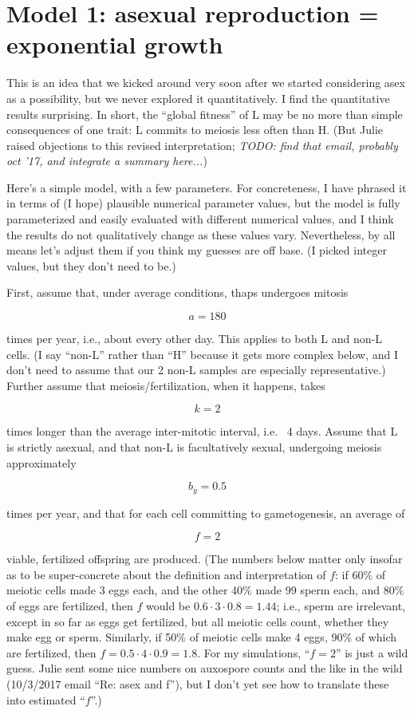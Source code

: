 \documentclass{article}\usepackage[]{graphicx}\usepackage[]{color}
\begin{document}
\section{Model 1: asexual reproduction = exponential growth}
\label{sec:asexpo}

This is an idea that we kicked around very soon after we started considering asex as a possibility,
but we never explored it quantitatively.  I find the quantitative results surprising.  In short,
the ``global fitness'' of L may be no more than simple consequences of one trait: L commits to
meiosis less often than H.  (But Julie raised objections to this revised interpretation;
\textit{TODO: find that email, probably oct '17, and integrate a summary here...})

Here's a simple model, with a few parameters.  For concreteness, I have phrased it in terms of (I
hope) plausible numerical parameter values, but the model is fully parameterized and easily
evaluated with different numerical values, and I think the results do not qualitatively change as
these values vary.  Nevertheless, by all means let's adjust them if you think my guesses are off
base.  (I picked integer values, but they don't need to be.)

First, assume that, under average conditions, thaps undergoes mitosis 

  $$a=180$$

\noindent times per year, i.e., about every other day.  This applies to both L and non-L cells.  (I
say ``non-L'' rather than ``H'' because it gets more complex below, and I don't need to assume that
our 2 non-L samples are especially representative.)  Further assume that meiosis/fertilization, when
it happens, takes

  $$k=2$$

\noindent times longer than the average inter-mitotic interval, i.e. ~4 days.  Assume that L is
strictly asexual, and that non-L is facultatively sexual, undergoing meiosis approximately

  $$b_{y}=0.5$$

\noindent times per year, and that for each cell committing to gametogenesis, an average of 

  $$f=2$$

\noindent viable, fertilized offspring are produced.  (The numbers below matter only insofar as to
be super-concrete about the definition and interpretation of $f$: if 60\% of meiotic cells made 3
eggs each, and the other 40\% made 99 sperm each, and 80\% of eggs are fertilized, then $f$ would be
$0.6\cdot3\cdot0.8=1.44$; i.e., sperm are irrelevant, except in so far as eggs get fertilized, but
all meiotic cells count, whether they make egg or sperm.  Similarly, if 50\% of meiotic cells make 4
eggs, 90\% of which are fertilized, then $f=0.5\cdot4\cdot0.9=1.8$.  For my simulations, ``$f=2$''
is just a wild guess.  Julie sent some nice numbers on auxospore counts and the like in the wild
(10/3/2017 email ``Re: asex and f''), but I don't yet see how to translate these into estimated
``$f$''.)
\end{document}
